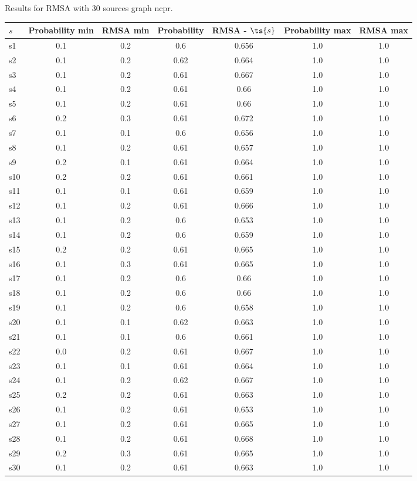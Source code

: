 \documentclass{article}
\begin{document}
\noindent Results for RMSA with 30 sources graph ncpr.

\noindent\begin{tabular}{|l|c|c|c|c|c|c|}
\hline
$s$& Probability min & RMSA min & Probability & RMSA - $\ts{s}$ & Probability max & RMSA max\\
\hline
s1 &0.1 & 0.2 & 0.6 & 0.656 & 1.0 & 1.0\\
\hline
s2 &0.1 & 0.2 & 0.62 & 0.664 & 1.0 & 1.0\\
\hline
s3 &0.1 & 0.2 & 0.61 & 0.667 & 1.0 & 1.0\\
\hline
s4 &0.1 & 0.2 & 0.61 & 0.66 & 1.0 & 1.0\\
\hline
s5 &0.1 & 0.2 & 0.61 & 0.66 & 1.0 & 1.0\\
\hline
s6 &0.2 & 0.3 & 0.61 & 0.672 & 1.0 & 1.0\\
\hline
s7 &0.1 & 0.1 & 0.6 & 0.656 & 1.0 & 1.0\\
\hline
s8 &0.1 & 0.2 & 0.61 & 0.657 & 1.0 & 1.0\\
\hline
s9 &0.2 & 0.1 & 0.61 & 0.664 & 1.0 & 1.0\\
\hline
s10 &0.2 & 0.2 & 0.61 & 0.661 & 1.0 & 1.0\\
\hline
s11 &0.1 & 0.1 & 0.61 & 0.659 & 1.0 & 1.0\\
\hline
s12 &0.1 & 0.2 & 0.61 & 0.666 & 1.0 & 1.0\\
\hline
s13 &0.1 & 0.2 & 0.6 & 0.653 & 1.0 & 1.0\\
\hline
s14 &0.1 & 0.2 & 0.6 & 0.659 & 1.0 & 1.0\\
\hline
s15 &0.2 & 0.2 & 0.61 & 0.665 & 1.0 & 1.0\\
\hline
s16 &0.1 & 0.3 & 0.61 & 0.665 & 1.0 & 1.0\\
\hline
s17 &0.1 & 0.2 & 0.6 & 0.66 & 1.0 & 1.0\\
\hline
s18 &0.1 & 0.2 & 0.6 & 0.66 & 1.0 & 1.0\\
\hline
s19 &0.1 & 0.2 & 0.6 & 0.658 & 1.0 & 1.0\\
\hline
s20 &0.1 & 0.1 & 0.62 & 0.663 & 1.0 & 1.0\\
\hline
s21 &0.1 & 0.1 & 0.6 & 0.661 & 1.0 & 1.0\\
\hline
s22 &0.0 & 0.2 & 0.61 & 0.667 & 1.0 & 1.0\\
\hline
s23 &0.1 & 0.1 & 0.61 & 0.664 & 1.0 & 1.0\\
\hline
s24 &0.1 & 0.2 & 0.62 & 0.667 & 1.0 & 1.0\\
\hline
s25 &0.2 & 0.2 & 0.61 & 0.663 & 1.0 & 1.0\\
\hline
s26 &0.1 & 0.2 & 0.61 & 0.653 & 1.0 & 1.0\\
\hline
s27 &0.1 & 0.2 & 0.61 & 0.665 & 1.0 & 1.0\\
\hline
s28 &0.1 & 0.2 & 0.61 & 0.668 & 1.0 & 1.0\\
\hline
s29 &0.2 & 0.3 & 0.61 & 0.665 & 1.0 & 1.0\\
\hline
s30 &0.1 & 0.2 & 0.61 & 0.663 & 1.0 & 1.0\\
\hline
\end{tabular}\\
\end{document}
